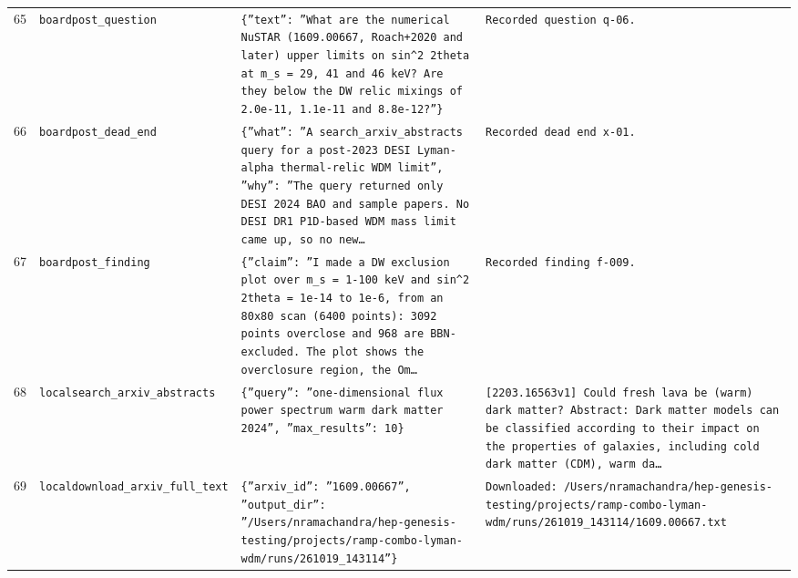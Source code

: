 \documentclass[11pt,a4paper]{article}
\begin{document}
\begin{longtable}{@{}p{}p{}p{}p{}@{}}
65 & \texttt{board}\newline\texttt{post\_\allowbreak{}question} & \texttt{\{''text'':\allowbreak{} ''What are the numerical NuSTAR (1609.00667,\allowbreak{} Roach+2020 and later)\allowbreak{} upper limits on sin\textasciicircum{}\allowbreak{}2 2theta at m\_\allowbreak{}s =\allowbreak{} 29,\allowbreak{} 41 and 46 keV? Are they below the DW relic mixings of 2.0e-11,\allowbreak{} 1.1e-11 and 8.8e-12?''\}\allowbreak{}} & \texttt{Recorded question q-06.} \\
66 & \texttt{board}\newline\texttt{post\_\allowbreak{}dead\_\allowbreak{}end} & \texttt{\{''what'':\allowbreak{} ''A search\_\allowbreak{}arxiv\_\allowbreak{}abstracts query for a post-2023 DESI Lyman-alpha thermal-relic WDM limit'',\allowbreak{} ''why'':\allowbreak{} ''The query returned only DESI 2024 BAO and sample papers. No DESI DR1 P1D-based WDM mass limit came up,\allowbreak{} so no new\ldots{}\allowbreak{}} & \texttt{Recorded dead end x-01.} \\
67 & \texttt{board}\newline\texttt{post\_\allowbreak{}finding} & \texttt{\{''claim'':\allowbreak{} ''I made a DW exclusion plot over m\_\allowbreak{}s =\allowbreak{} 1-100 keV and sin\textasciicircum{}\allowbreak{}2 2theta =\allowbreak{} 1e-14 to 1e-6,\allowbreak{} from an 80x80 scan (6400 points)\allowbreak{}:\allowbreak{} 3092 points overclose and 968 are BBN-excluded. The plot shows the overclosure region,\allowbreak{} the Om\ldots{}\allowbreak{}} & \texttt{Recorded finding f-009.} \\
68 & \texttt{local}\newline\texttt{search\_\allowbreak{}arxiv\_\allowbreak{}abstracts} & \texttt{\{''query'':\allowbreak{} ''one-dimensional flux power spectrum warm dark matter 2024'',\allowbreak{} ''max\_\allowbreak{}results'':\allowbreak{} 10\}\allowbreak{}} & \texttt{[2203.16563v1]\allowbreak{} Could fresh lava be (warm)\allowbreak{} dark matter? Abstract:\allowbreak{} Dark matter models can be classified according to their impact on the properties of galaxies,\allowbreak{} including cold dark matter (CDM)\allowbreak{},\allowbreak{} warm da\ldots{}\allowbreak{}} \\
69 & \texttt{local}\newline\texttt{download\_\allowbreak{}arxiv\_\allowbreak{}full\_\allowbreak{}text} & \texttt{\{''arxiv\_\allowbreak{}id'':\allowbreak{} ''1609.00667'',\allowbreak{} ''output\_\allowbreak{}dir'':\allowbreak{} ''/\allowbreak{}Users/\allowbreak{}nramachandra/\allowbreak{}hep-genesis-testing/\allowbreak{}projects/\allowbreak{}ramp-combo-lyman-wdm/\allowbreak{}runs/\allowbreak{}261019\_\allowbreak{}143114''\}\allowbreak{}} & \texttt{Downloaded:\allowbreak{} /\allowbreak{}Users/\allowbreak{}nramachandra/\allowbreak{}hep-genesis-testing/\allowbreak{}projects/\allowbreak{}ramp-combo-lyman-wdm/\allowbreak{}runs/\allowbreak{}261019\_\allowbreak{}143114/\allowbreak{}1609.00667.txt} \\

\end{longtable}
\end{document}
